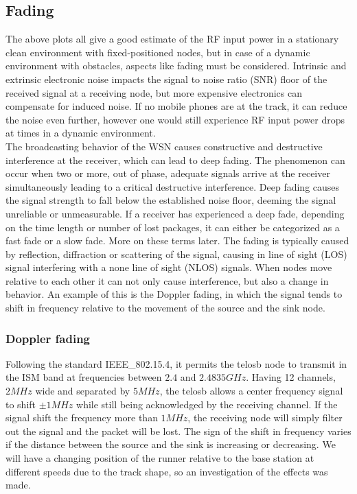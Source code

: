 \subsection{Fading}\label{sc:fading}

The above plots all give a good estimate of the RF input power in a stationary clean environment with fixed-positioned nodes, but in case of a dynamic environment with obstacles, aspects like fading must be considered. Intrinsic and extrinsic electronic noise impacts the signal to noise ratio (SNR) floor of the received signal at a receiving node, but more expensive electronics can compensate for induced noise. If no mobile phones are at the track, it can reduce the noise even further, however one would still 
experience RF input power drops at times in a dynamic environment.\\

\noindent The broadcasting behavior of the WSN causes constructive and destructive interference at the receiver, which can lead to deep fading. The phenomenon can occur when two or more, out of phase, adequate signals arrive at the receiver simultaneously leading to a critical destructive interference. Deep fading causes the signal strength to fall below the established noise floor, deeming the signal unreliable or unmeasurable. If a receiver has experienced a deep fade, depending on the time length or number of lost packages, it can either be categorized as a fast fade or a slow fade. More on these terms later. The fading is typically caused by reflection, diffraction or scattering of the signal, causing in line of sight (LOS) signal interfering with a none line of sight (NLOS) signals. When nodes move relative to each other it can not only cause interference, but also a change in behavior. An example of this is the Doppler fading, in which the signal tends to shift in frequency relative to the movement of the source and the sink node.

\subsubsection{Doppler fading}
Following the standard IEEE\_802.15.4, it permits the telosb node to transmit in the ISM band at frequencies between $2.4$ and $2.4835 GHz$. Having 12 channels, $2 MHz$ wide and separated by $5 MHz$, the telosb allows a center frequency signal to shift $\pm 1 MHz$ while still being acknowledged by the receiving channel. If the signal shift the frequency more than $1 MHz$, the receiving node will simply filter out the signal and the packet will be lost. The sign of the shift in frequency varies if the distance between the source and the sink is increasing or decreasing. We will have a changing position of the runner relative to the base station at different speeds due to the track shape, so an investigation of the effects was made.\\

